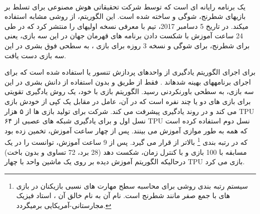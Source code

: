    
   

%
  
  

\paragraph{}
یک برنامه رایانه ای است که توسط شرکت تحقیقاتی هوش مصنوعی
 برای تسلط بر بازی\nf های شطرنج، شوگی و 
ساخته شده است. این الگوریتم، از روشی مشابه
  استفاده می\nf کند. در تاریخ 5 دسامبر 2017، تیم
  با معرفی
   نسخه اولیه\nf ای را منتشر کرد که در طی 24 ساعت آموزش با شکست دادن برنامه های قهرمان جهان در این سه بازی، یعنی
    برای شطرنج،
برای شوگی و نسخه 3 روزه
برای بازی 
،
به سطحی فوق بشری در این سه بازی دست یافت. 

برای اجرای الگوریتم یادگیری
از واحدهای پردازش تنسور 
یا 
استفاده شده است که برای اجرای برنامه\nf های
بهینه شده\nf اند
\cite{silver2017}.
  فقط از طریق 
و بدون استفاده از دانش بشری در این سه بازی، به سطحی باورنکردنی رسید. الگوریتم بازی با خود، یک روش یادگیری تقویتی برای بازی های دو یا چند نفره است که در آن، عامل در مقابل یک کپی از خودش بازی می کند و در روند یادگیری پیشرفت می کند. شرکت
  برای تولید  بازی ها از ۵ هزار TPU نسل اول و برای یادگیری شبکه های عصبی از ۶۴ TPU نسل دوم استفاده کرده است که همه به طور موازی آموزش می بینند.
پس از چهار ساعت آموزش،
  تخمین زده بود که
    در رتبه بندی
\footnote{سیستم رتبه بندی
	  روشی برای محاسبه سطح مهارت های نسبی بازیکنان در بازی های با جمع صفر مانند شطرنج است. نام آن به نام خالق آن
،
استاد فیزیک مجارستانی-آمریکایی برمی\nf گردد.}
بالاتر از
  قرار می گیرد. پس از 9 ساعت آموزش، توانست
را در یک مسابقه با 100 بازی و با کنترل زمان، شکست دهد (28 برد، 72 تساوی و بدون باخت) 
\cite{silver2017} \cite{knapton2017entire} \cite{superhuman2017}
درحالی\nf که الگوریتم آموزش دیده بر روی یک ماشین واحد با چهار TPU بازی می کرد.

